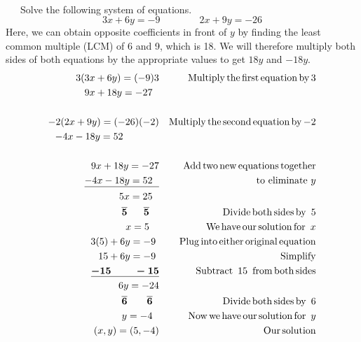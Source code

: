 \vspace{1in}
~\\

\begin{example}~~~Solve the following system of equations.
      $$3 x + 6 y = - 9\qquad\qquad 2 x + 9 y = - 26$$
Here, we can obtain opposite coefficients in front of $y$ by finding the least common multiple (LCM) of 6 and 9, which is 18.  We will therefore multiply both sides of both equations by the appropriate values to get $18y$ and $-18y$.
\begin{eqnarray*}
    3 (3 x + 6 y) = (- 9) 3 &  & \operatorname{Multiply} \operatorname{the} \operatorname{first}
    \operatorname{equation} \operatorname{by} 3\\
    9 x + 18 y = - 27~~ &  & \\
    &  & \\
    - 2 (2 x + 9 y) = (- 26) (- 2) &  & \operatorname{Multiply} \operatorname{the}
    \operatorname{second} \operatorname{equation} \operatorname{by} - 2\\
    - 4 x - 18 y = 52~~~~~~~~~~~ &  & \\
    &  & \\
    9 x + 18 y = - 27 &  & \operatorname{Add} \operatorname{two} \operatorname{new} \operatorname{equations}
    \operatorname{together}\\
    \underline{- 4 x - 18 y = 52~~} &  & \text{~~~to eliminate~} y\\
    5 x = 25~~ &  & \\
    \boldsymbol{\overline{5} ~~~~~ \overline{5}}~~~ &  & \operatorname{Divide} \operatorname{both} \operatorname{sides} \operatorname{by~} 5\\
    x = 5~~~ &  & \operatorname{We} \operatorname{have} \operatorname{our} \operatorname{solution} \operatorname{for~} x\\
    3 (5) + 6 y = - 9~ &  & \operatorname{Plug} \operatorname{into} \operatorname{either}
    \operatorname{original} \operatorname{equation}\\
    15 + 6 y = - 9~ &  & \operatorname{Simplify}\\
    \boldsymbol{\underline{- 15 ~~~~~~~- 15}} &  &\operatorname{Subtract~} 15 \operatorname{~from} \operatorname{both}
    \operatorname{sides}\\
    6 y = - 24 &  & \\
    \boldsymbol{\overline{6} ~~~~~~ \overline{6}}~~ &  & \operatorname{Divide} \operatorname{both} \operatorname{sides} \operatorname{by~} 6\\
    y = - 4~~ &  & \operatorname{Now} \operatorname{we} \operatorname{have} \operatorname{our} \operatorname{solution}
    \operatorname{for~} y\\
    (x,y)=(5, - 4) &  & \operatorname{Our} \operatorname{solution}
  \end{eqnarray*}
\end{example}


